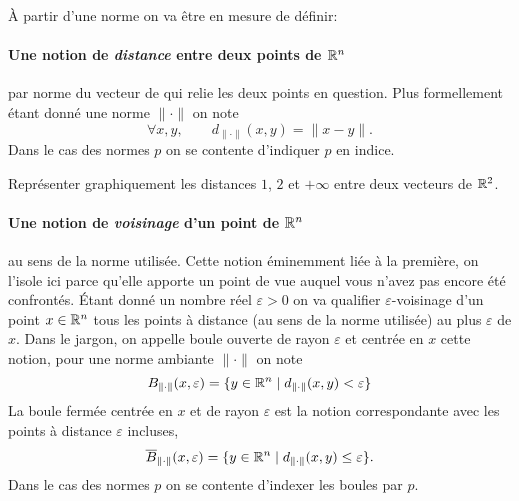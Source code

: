 \documentclass[11pt, a4paper]{article}
\begin{document}
À partir d'une norme on va être en mesure de définir:
\paragraph{Une notion de \textit{distance} entre deux points de
  $\mathbb{R}^n$} par norme du vecteur de qui relie les deux points en
question. Plus formellement étant donné une norme $\|\cdot\|$ on note
\[
  \forall x, y, \qquad d_{\|\cdot\|}(x, y) = \| x - y \|.
\]
Dans le cas des normes $p$ on se contente d'indiquer $p$ en indice.
\begin{question}
  Représenter graphiquement les distances $1$, $2$ et $+\infty$
  entre deux vecteurs de $\mathbb{R}^2$.
\end{question}
\paragraph{Une notion de \textit{voisinage} d'un point de $\mathbb{R}^n$} au
sens de la norme utilisée. Cette notion éminemment liée à la
première, on l'isole ici parce qu'elle apporte un point de vue
auquel vous n'avez pas encore été confrontés. Étant donné un nombre
réel $\varepsilon > 0$ on va qualifier $\varepsilon$-voisinage d'un
point $x \in \mathbb{R}^n$ tous les points à distance (au sens de la norme
utilisée) au plus $\varepsilon$ de $x$. Dans le jargon, on appelle
boule ouverte de rayon $\varepsilon$ et centrée en $x$ cette notion,
pour une norme ambiante $\|\cdot\|$ on note
\[
  B_{\|\cdot\|}(x, \varepsilon) = \{y \in \mathbb{R}^n \mid d_{\|\cdot\|}(x, y) <
  \varepsilon\}
\]
La boule fermée centrée en $x$ et de rayon $\varepsilon$ est la
notion correspondante avec les points à distance $\varepsilon$
incluses,
\[
  \overline{B}_{\|\cdot\|}(x, \varepsilon) = \{y \in \mathbb{R}^n \mid d_{\|\cdot\|}(x,
  y) \leq \varepsilon\}.
\]
Dans le cas des normes $p$ on se contente d'indexer les boules par
$p$.
\end{document}
